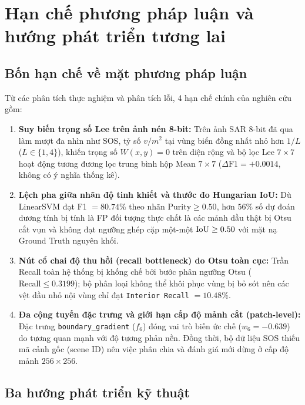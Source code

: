 \section{Hạn chế phương pháp luận và hướng phát triển tương lai}
\label{sec:han_che_huong_phat_trien}

\subsection{Bốn hạn chế về mặt phương pháp luận}

Từ các phân tích thực nghiệm và phân tích lỗi, 4 hạn chế chính của nghiên cứu gồm:
\begin{enumerate}
    \item \textbf{Suy biến trọng số Lee trên ảnh nén 8-bit:} Trên ảnh SAR 8-bit đã qua làm mượt đa nhìn như SOS, tỷ số $v/m^2$ tại vùng biển đồng nhất nhỏ hơn $1/L$ ($L \in \{1, 4\}$), khiến trọng số $W(x, y) = 0$ trên diện rộng và bộ lọc Lee $7 \times 7$ hoạt động tương đương lọc trung bình hộp Mean $7 \times 7$ ($\Delta\text{F1} = +0.0014$, không có ý nghĩa thống kê).
    \item \textbf{Lệch pha giữa nhãn độ tinh khiết và thước đo Hungarian IoU:} Dù LinearSVM đạt F1 $= 80.74\%$ theo nhãn $\mathrm{Purity} \ge 0.50$, hơn $56\%$ số dự đoán dương tính bị tính là FP đối tượng thực chất là các mảnh dầu thật bị Otsu cắt vụn và không đạt ngưỡng ghép cặp một-một $\mathrm{IoU} \ge 0.50$ với mặt nạ Ground Truth nguyên khối.
    \item \textbf{Nút cổ chai độ thu hồi (recall bottleneck) do Otsu toàn cục:} Trần Recall toàn hệ thống bị khống chế bởi bước phân ngưỡng Otsu ($\text{Recall} \le 0.3199$); bộ phân loại không thể khôi phục vùng bị bỏ sót nên các vệt dầu nhỏ nội vùng chỉ đạt \texttt{Interior Recall} $= 10.48\%$.
    \item \textbf{Đa cộng tuyến đặc trưng và giới hạn cấp độ mảnh cắt (patch-level):} Đặc trưng \texttt{boundary\_gradient} ($f_6$) đóng vai trò biến ức chế ($w_6 = -0.639$) do tương quan mạnh với độ tương phản nền. Đồng thời, bộ dữ liệu SOS thiếu mã cảnh gốc (scene ID) nên việc phân chia và đánh giá mới dừng ở cấp độ mảnh $256 \times 256$.
\end{enumerate}

\subsection{Ba hướng phát triển kỹ thuật}

